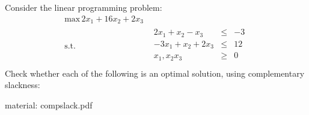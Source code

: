\Exercise Consider the linear programming problem:
\begin{equation*}
  \begin{aligned}
    \text{max} \, 2x_1 + 16x_2 + 2x_3 \\
    \text{s.t.}\quad &
    \begin{array}{rcl}
      2x_1 + x_2-x_3  & \leq & -3 \\
      -3x_1+x_2+2x_3& \leq & 12 \\
      x_1,x_2x_3  & \geq & 0 \\
    \end{array}
  \end{aligned}
\end{equation*}
Check whether each of the following is an optimal solution, using complementary slackness:

\Answer 

material: compslack.pdf